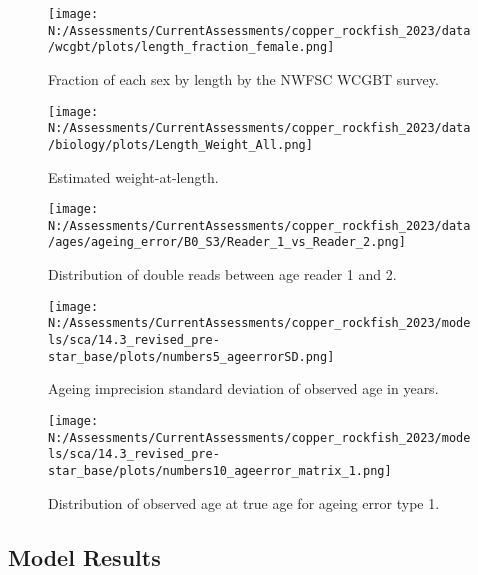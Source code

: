 \documentclass[11pt,
  english,
  letterpaper,
]{article}
\begin{document}
\pagebreak

\begin{figure}
\centering
\texttt{[image: N:/Assessments/CurrentAssessments/copper\_rockfish\_2023/data/wcgbt/plots/length\_fraction\_female.png]}
\caption{Fraction of each sex by length by the NWFSC WCGBT survey.\label{fig:frac-sex-len}}
\end{figure}

\pagebreak

\begin{figure}
\centering
\texttt{[image: N:/Assessments/CurrentAssessments/copper\_rockfish\_2023/data/biology/plots/Length\_Weight\_All.png]}
\caption{Estimated weight-at-length.\label{fig:weight-length}}
\end{figure}

\pagebreak

\begin{figure}
\centering
\texttt{[image: N:/Assessments/CurrentAssessments/copper\_rockfish\_2023/data/ages/ageing\_error/B0\_S3/Reader\_1\_vs\_Reader\_2.png]}
\caption{Distribution of double reads between age reader 1 and 2.\label{fig:age-error-dist}}
\end{figure}

\pagebreak

\begin{figure}
\centering
\texttt{[image: N:/Assessments/CurrentAssessments/copper\_rockfish\_2023/models/sca/14.3\_revised\_pre-star\_base/plots/numbers5\_ageerrorSD.png]}
\caption{Ageing imprecision standard deviation of observed age in years.\label{fig:age-error}}
\end{figure}

\pagebreak

\begin{figure}
\centering
\texttt{[image: N:/Assessments/CurrentAssessments/copper\_rockfish\_2023/models/sca/14.3\_revised\_pre-star\_base/plots/numbers10\_ageerror\_matrix\_1.png]}
\caption{Distribution of observed age at true age for ageing error type 1.\label{fig:age-error-matrix}}
\end{figure}

\pagebreak

\hypertarget{model-results}{%
\subsection{Model Results}\label{model-results}}
\end{document}

